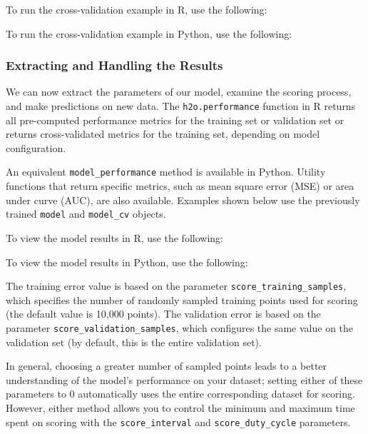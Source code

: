 {{\waterExampleInR
To run the cross-validation example in R, use the following: 


\waterExampleInPython
To run the cross-validation example in Python, use the following: 


\subsubsection{Extracting and Handling the Results} 

We can now extract the parameters of our model, examine the scoring process, and make predictions on new data.  The \texttt{h2o.performance} function in R returns all pre-computed performance metrics for the training set or validation set or returns cross-validated metrics for the training set, depending on model configuration. 

An equivalent \texttt{model\_performance} method is available in Python.  Utility functions that return specific metrics, such as mean square error (MSE) or area under curve (AUC), are also available.  Examples shown below use the previously trained \texttt{model} and \texttt{model\_cv} objects.

\waterExampleInR
To view the model results in R, use the following: 


\newpage
\waterExampleInPython
To view the model results in Python, use the following: 



\noindent
The training error value is based on the parameter \texttt{score\_training\_samples}, which specifies the number of randomly sampled training points used for scoring (the default value is 10,000 points). The validation error is based on the parameter \texttt{score\_validation\_samples}, which configures the same value on the validation set (by default, this is the entire validation set).

In general, choosing a greater number of sampled points leads to a better understanding of the model's performance on your dataset; setting either of these parameters to 0 automatically uses the entire corresponding dataset for scoring. However, either method allows you to control the minimum and maximum time spent on scoring with the \texttt{score\_interval} and \texttt{score\_duty\_cycle} parameters.

}}
